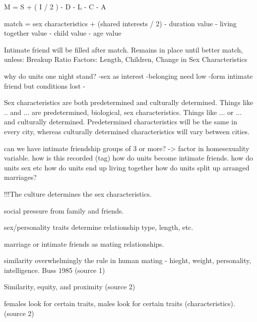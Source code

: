 
M = S + ( I / 2 ) - D - L - C - A

match =  sex characteristics + (shared interests / 2) - duration value - living together value - child value - age value





Intimate friend will be filled after match.
Remains in place until better match, unless: Breakup Ratio Factors: Length, Children, Change in Sex Characteristics

why do units one night stand?
-sex as interest
-belonging need low
-form intimate friend but conditions lost
-






Sex characteristics are both predetermined and culturally determined. Things like .. and ... are predetermined, biological, sex characteristics. Things like ... or ... and culturally determined. Predetermined characteristics will be the same in every city, whereas culturally determined characteristics will vary between cities. 





can we have intimate friendship groups of 3 or more? -> factor in homesexuality variable.
how is this recorded (tag)
how do units become intimate friends.
how do units sex etc
how do units end up living together
how do units split up
arranged marriages?


!!!The culture determines the sex characteristics.

social pressure from family and friends.

sex/personality traits determine relationship type, length, etc.

marriage or intimate friends as mating relationships.

similarity overwhelmingly the rule in human mating - hieght, weight, personality, intelligence. Buss 1985 (source 1)

Similarity, equity, and proximity (source 2)

females look for certain traits, males look for certain traits (characteristics).(source 2)

